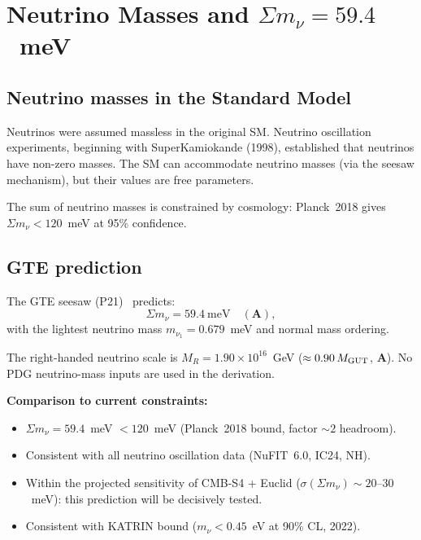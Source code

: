 \documentclass[11pt,a4paper]{article}
\newcommand{\CatA}{\textbf{A}}
\begin{document}
\section{Neutrino Masses and $\Sigma m_\nu = 59.4$~meV}
\label{sec:neutrino}

\subsection{Neutrino masses in the Standard Model}

Neutrinos were assumed massless in the original SM.
Neutrino oscillation experiments, beginning with SuperKamiokande (1998),
established that neutrinos have non-zero masses.
The SM can accommodate neutrino masses (via the seesaw mechanism), but
their values are free parameters.

The sum of neutrino masses is constrained by cosmology:
Planck~2018 gives $\Sigma m_\nu < 120$~meV at 95\% confidence.

\subsection{GTE prediction}

The GTE seesaw (P21)~\cite{SpivackGTECompleteFramework} predicts:
\begin{equation}
  \Sigma m_\nu = 59.4~\text{meV} \quad (\CatA),
  \label{eq:mnu}
\end{equation}
with the lightest neutrino mass $m_{\nu_1} = 0.679$~meV and normal mass ordering.

The right-handed neutrino scale is $M_R = 1.90 \times 10^{16}$~GeV
($\approx 0.90\, M_{\rm GUT}$, \CatA).
No PDG neutrino-mass inputs are used in the derivation.

\textbf{Comparison to current constraints:}
\begin{itemize}[itemsep=2pt]
  \item $\Sigma m_\nu = 59.4$~meV $< 120$~meV (Planck~2018 bound, factor $\sim 2$ headroom).
  \item Consistent with all neutrino oscillation data (NuFIT~6.0, IC24, NH).
  \item Within the projected sensitivity of CMB-S4 + Euclid
        ($\sigma(\Sigma m_\nu) \sim 20$--$30$~meV): this prediction will be
        decisively tested.
  \item Consistent with KATRIN bound ($m_\nu < 0.45$~eV at 90\% CL, 2022).
\end{itemize}
\end{document}
